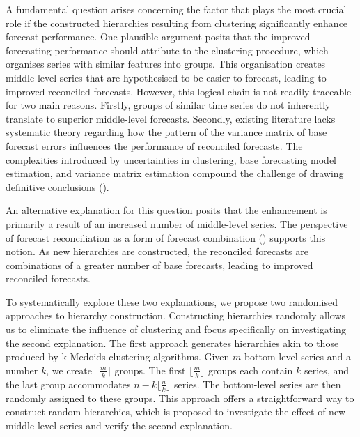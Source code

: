 \documentclass[a4paper,review,12pt,authoryear]{elsarticle}
\begin{document}
A fundamental question arises concerning the factor that plays the most crucial role if the constructed hierarchies resulting from clustering significantly enhance forecast performance. One plausible argument posits that the improved forecasting performance should attribute to the clustering procedure, which organises series with similar features into groups.
This organisation creates middle-level series that are hypothesised to be easier to forecast, leading to improved reconciled forecasts. However, this logical chain is not readily traceable for two main reasons. Firstly, groups of similar time series do not inherently translate to superior middle-level forecasts. Secondly, existing literature lacks systematic theory regarding how the pattern of the variance matrix of base forecast errors influences the performance of reconciled forecasts. The complexities introduced by uncertainties in clustering, base forecasting model estimation, and variance matrix estimation compound the challenge of drawing definitive conclusions (\citealp{pritulargaStochasticCoherencyForecast2021}).

An alternative explanation for this question posits that the enhancement is primarily a result of an increased number of middle-level series. The perspective of forecast reconciliation as a form of forecast combination (\citealp{hollymanUnderstandingForecastReconciliation2021}) supports this notion. As new hierarchies are constructed, the reconciled forecasts are combinations of a greater number of base forecasts, leading to improved reconciled forecasts.

To systematically explore these two explanations, we propose two randomised approaches to hierarchy construction. Constructing hierarchies randomly allows us to eliminate the influence of clustering and focus specifically on investigating the second explanation. 
The first approach generates hierarchies akin to those produced by k-Medoids clustering algorithms. Given $m$ bottom-level series and a number $k$, we create $\lceil\frac{m}{k}\rceil$ groups. The first $\lfloor\frac{m}{k}\rfloor$ groups each contain $k$ series, and the last group accommodates $n - k\lfloor\frac{n}{k}\rfloor$ series. The bottom-level series are then randomly assigned to these groups.
This approach offers a straightforward way to construct random hierarchies, which is proposed to investigate the effect of new middle-level series and verify the second explanation. 
\end{document}
